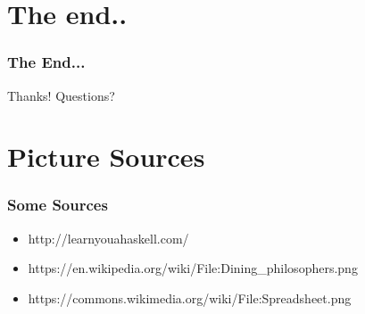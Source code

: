 \documentclass[12pt, xcolor=table]{beamer}
\begin{document}
\section{The end..} %
\begin{frame}
    \frametitle{The End...}
    \begin{block}{Thanks!}
        Questions?
    \end{block}
\end{frame}

\section{Picture Sources}
\begin{frame}
    \frametitle{Some Sources}
    \begin{itemize}
        \item http://learnyouahaskell.com/
        \item https://en.wikipedia.org/wiki/File:Dining\_philosophers.png
        \item https://commons.wikimedia.org/wiki/File:Spreadsheet.png
    \end{itemize}
\end{frame}
\end{document}
